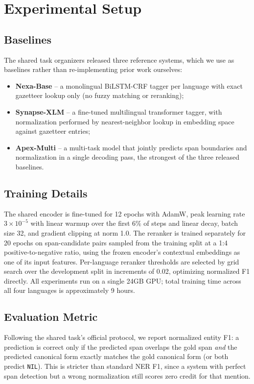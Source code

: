 \section{Experimental Setup}

\subsection{Baselines}
The shared task organizers released three reference systems, which we use
as baselines rather than re-implementing prior work ourselves:

\begin{itemize}[leftmargin=1.1em,itemsep=1pt,topsep=2pt]
  \item \textbf{Nexa-Base} -- a monolingual BiLSTM-CRF tagger per language
    with exact gazetteer lookup only (no fuzzy matching or reranking);
  \item \textbf{Synapse-XLM} -- a fine-tuned multilingual transformer
    tagger, with normalization performed by nearest-neighbor lookup in
    embedding space against gazetteer entries;
  \item \textbf{Apex-Multi} -- a multi-task model that jointly predicts
    span boundaries and normalization in a single decoding pass, the
    strongest of the three released baselines.
\end{itemize}

\subsection{Training Details}
The shared encoder is fine-tuned for 12 epochs with AdamW, peak learning
rate $3\times10^{-5}$ with linear warmup over the first 6\% of steps and
linear decay, batch size 32, and gradient clipping at norm 1.0. The
reranker is trained separately for 20 epochs on span-candidate pairs
sampled from the training split at a 1:4 positive-to-negative ratio, using
the frozen encoder's contextual embeddings as one of its input features.
Per-language reranker thresholds are selected by grid search over the
development split in increments of 0.02, optimizing normalized F1
directly. All experiments run on a single 24GB GPU; total training time
across all four languages is approximately 9 hours.

\subsection{Evaluation Metric}
Following the shared task's official protocol, we report normalized
entity F1: a prediction is correct only if the predicted span overlaps the
gold span \emph{and} the predicted canonical form exactly matches the
gold canonical form (or both predict \texttt{NIL}). This is stricter than
standard NER F1, since a system with perfect span detection but a wrong
normalization still scores zero credit for that mention.
